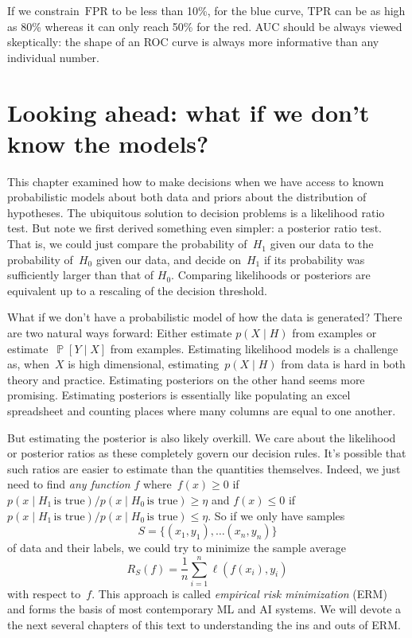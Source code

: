 \documentclass{tufte-book}
\begin{document}
If we constrain~\(\mathrm{FPR}\) to be less than 10\%, for the blue
curve, \(\mathrm{TPR}\) can be as high as 80\% whereas it can only reach
50\% for the red. AUC should be always viewed skeptically: the shape of
an ROC curve is always more informative than any individual number.

\hypertarget{looking-ahead-what-if-we-dont-know-the-models}{%
\section{Looking ahead: what if we don't know the
models?}\label{looking-ahead-what-if-we-dont-know-the-models}}

This chapter examined how to make decisions when we have access to known
probabilistic models about both data and priors about the distribution
of hypotheses. The ubiquitous solution to decision problems is a
likelihood ratio test. But note we first derived something even simpler:
a posterior ratio test. That is, we could just compare the probability
of~\(H_1\) given our data to the probability of~\(H_0\) given our data,
and decide on~\(H_1\) if its probability was sufficiently larger than
that of \(H_0\). Comparing likelihoods or posteriors are equivalent up
to a rescaling of the decision threshold.

What if we don't have a probabilistic model of how the data is
generated? There are two natural ways forward: Either estimate
\(p(X\mid H)\) from examples or estimate~\(\mathop\mathbb{P}[Y\mid X]\)
from examples. Estimating likelihood models is a challenge as,
when~\(X\) is high dimensional, estimating~\(p(X\mid H)\) from data is
hard in both theory and practice. Estimating posteriors on the other
hand seems more promising. Estimating posteriors is essentially like
populating an excel spreadsheet and counting places where many columns
are equal to one another.

But estimating the posterior is also likely overkill. We care about the
likelihood or posterior ratios as these completely govern our decision
rules. It's possible that such ratios are easier to estimate than the
quantities themselves. Indeed, we just need to find \emph{any function}
\(f\) where~\(f(x)\geq0\) if
\(p(x\mid H_1\,\text{is true})/p(x\mid H_0\,\text{is true})\geq \eta\)
and \(f(x)\leq0\) if
\(p(x\mid H_1\,\text{is true})/p(x\mid H_0\,\text{is true})\leq \eta\).
So if we only have samples \[
S= \{(x_1,y_1),\ldots (x_n,y_n)\}
\] of data and their labels, we could try to minimize the sample average
\[
    R_S(f) = \frac{1}{n} \sum_{i=1}^n \ell( f(x_i), y_i)
\] with respect to~\(f\). This approach is called \emph{empirical risk
minimization} (ERM) and forms the basis of most contemporary ML and AI
systems. We will devote a the next several chapters of this text to
understanding the ins and outs of ERM.
\end{document}
